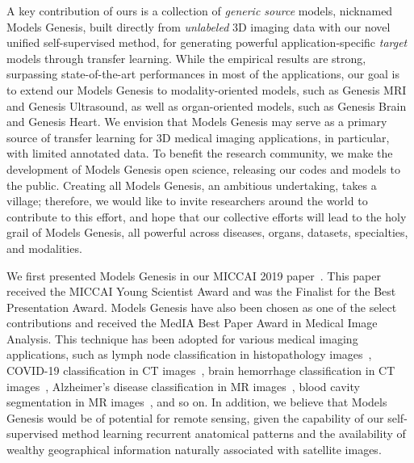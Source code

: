 A key contribution of ours is a collection of \textit{generic source} models, nicknamed Models Genesis, built directly from {\em unlabeled} 3D imaging data with our novel unified self-supervised method, for generating powerful application-specific \textit{target} models through transfer learning. While the empirical results are strong, surpassing state-of-the-art performances in most of the applications, our goal is to extend our Models Genesis to modality-oriented models, such as Genesis MRI and Genesis Ultrasound, as well as organ-oriented models, such as Genesis Brain and Genesis Heart. We envision that Models Genesis may serve as a primary source of transfer learning for 3D medical imaging applications, in particular, with limited annotated data. 
To benefit the research community, we make the development of Models Genesis open science, releasing our codes and models to the public. 
Creating all Models Genesis, an ambitious undertaking, takes a village; therefore, we would like to invite researchers around the world to contribute to this effort, and hope that our collective efforts will lead to the holy grail of Models Genesis, all powerful across diseases, organs, datasets, specialties, and modalities.

We first presented Models Genesis in our MICCAI 2019 paper~\citep{zhou2019models}. This paper received the MICCAI Young Scientist Award and was the Finalist for the Best Presentation Award. Models Genesis have also been chosen as one of the select contributions and received the MedIA Best Paper Award in Medical Image Analysis. This technique has been adopted for various medical imaging applications, such as lymph node classification in histopathology images~\citep{xu2020data}, COVID-19 classification in CT images~\citep{sun2020context}, brain hemorrhage classification in CT images~\citep{zhu2020aggregative}, Alzheimer's disease classification in MR images~\citep{zhang2020universal}, blood cavity segmentation in MR images~\citep{zhang2020universal}, and so on. In addition, we believe that Models Genesis would be of potential for remote sensing, given the capability of our self-supervised method learning recurrent anatomical patterns and the availability of wealthy geographical information naturally associated with satellite images.




